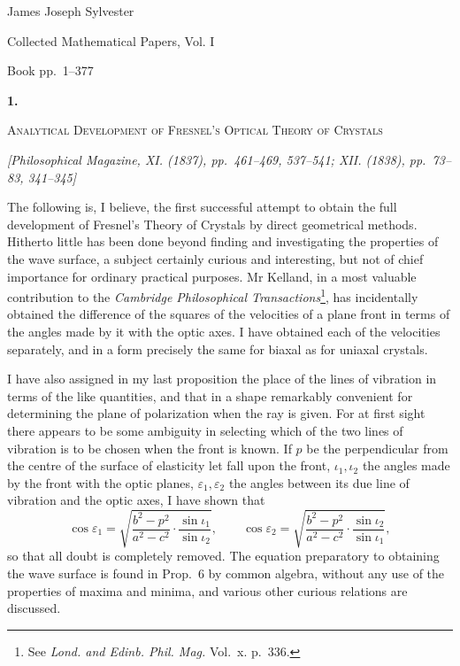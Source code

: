 \documentclass[11pt]{article}
\newcommand{\paperhead}[3]{%
  \clearpage
  \begin{center}
  {\Large\bfseries #1.}\par\vspace{0.85em}
  {\large\scshape #2}\par\vspace{0.6em}
  {\itshape [#3]}\par
  \end{center}\vspace{0.4em}}
\newcommand{\sourcepage}[1]{\marginpar{\scriptsize p.~#1}}
\begin{document}
\begin{center}
{\Large James Joseph Sylvester}\par\vspace{0.25em}
{\large Collected Mathematical Papers, Vol. I}\par\vspace{0.25em}
{\normalsize Book pp.~1--377}\par
\end{center}
\thispagestyle{empty}
\vspace{0.75em}

\paperhead{1}{Analytical Development of Fresnel's Optical Theory of Crystals}{Philosophical Magazine, XI. (1837), pp.~461--469, 537--541; XII. (1838), pp.~73--83, 341--345}

\sourcepage{1}
The following is, I believe, the first successful attempt to obtain the full development of Fresnel's Theory of Crystals by direct geometrical methods. Hitherto little has been done beyond finding and investigating the properties of the wave surface, a subject certainly curious and interesting, but not of chief importance for ordinary practical purposes. Mr Kelland, in a most valuable contribution to the \emph{Cambridge Philosophical Transactions}\footnote{See \emph{Lond. and Edinb. Phil. Mag.} Vol.~x. p.~336.}, has incidentally obtained the difference of the squares of the velocities of a plane front in terms of the angles made by it with the optic axes. I have obtained each of the velocities separately, and in a form precisely the same for biaxal as for uniaxal crystals.

I have also assigned in my last proposition the place of the lines of vibration in terms of the like quantities, and that in a shape remarkably convenient for determining the plane of polarization when the ray is given. For at first sight there appears to be some ambiguity in selecting which of the two lines of vibration is to be chosen when the front is known. If $p$ be the perpendicular from the centre of the surface of elasticity let fall upon the front, $\iota_1,\iota_2$ the angles made by the front with the optic planes, $\varepsilon_1,\varepsilon_2$ the angles between its due line of vibration and the optic axes, I have shown that
\[
\cos \varepsilon_1=
\sqrt{\frac{b^2-p^2}{a^2-c^2}\cdot\frac{\sin\iota_1}{\sin\iota_2}},
\qquad
\cos \varepsilon_2=
\sqrt{\frac{b^2-p^2}{a^2-c^2}\cdot\frac{\sin\iota_2}{\sin\iota_1}},
\]
so that all doubt is completely removed. The equation preparatory to obtaining the wave surface is found in Prop.~6 by common algebra, without any use of the properties of maxima and minima, and various other curious relations are discussed.
\end{document}

